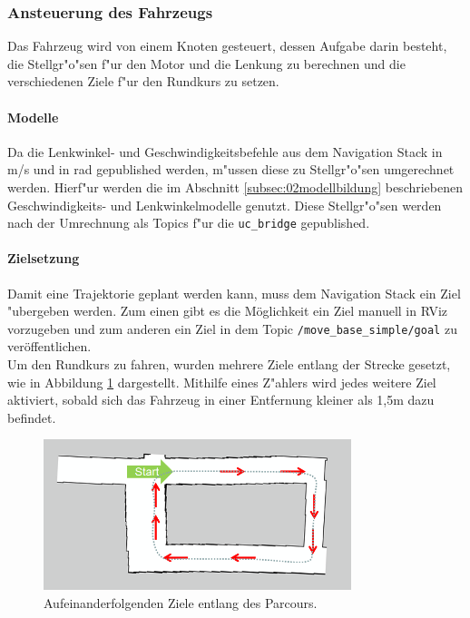 \subsubsection{Ansteuerung des Fahrzeugs}
\label{subsubsec:02psesTrajectory}
Das Fahrzeug wird von einem Knoten gesteuert, dessen Aufgabe darin besteht, die Stellgr"o"sen f"ur den Motor und die Lenkung zu berechnen und die verschiedenen Ziele f"ur den Rundkurs zu setzen.

\paragraph{Modelle}
Da die Lenkwinkel- und Geschwindigkeitsbefehle aus dem Navigation Stack in \si[per-mode=symbol]{\meter\per\second} und in \si[per-mode=symbol]{\radian} gepublished werden, m"ussen diese zu Stellgr"o"sen umgerechnet werden. Hierf"ur werden die im Abschnitt \ref{subsec:02modellbildung} beschriebenen Geschwindigkeits- und Lenkwinkelmodelle genutzt. Diese Stellgr"o"sen werden nach der Umrechnung als Topics f"ur die \texttt{uc\_bridge} gepublished.

\paragraph{Zielsetzung}
Damit eine Trajektorie geplant werden kann, muss dem Navigation Stack ein Ziel "ubergeben werden. Zum einen gibt es die M\"oglichkeit ein Ziel manuell in RViz vorzugeben und zum anderen ein Ziel in dem Topic \texttt{/move\_base\_simple/goal} zu ver\"offentlichen.\\
Um den Rundkurs zu fahren, wurden mehrere Ziele entlang der Strecke gesetzt, wie in Abbildung \ref{fig:goals} dargestellt. Mithilfe eines Z"ahlers wird jedes weitere Ziel aktiviert, sobald sich das Fahrzeug in einer Entfernung kleiner als 1,5m dazu befindet.

\begin{figure}[h]
	\centering
	\includegraphics[width=0.8\textwidth,trim=2.4cm 0cm 0cm 1cm,clip]{pics/goals.png}
	\caption{Aufeinanderfolgenden Ziele entlang des Parcours.}
	\label{fig:goals}
\end{figure}

